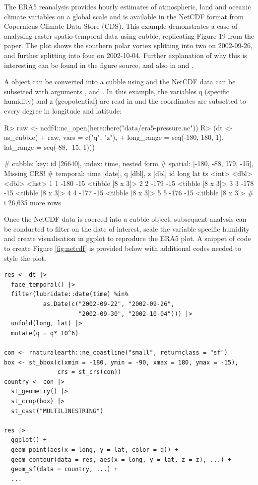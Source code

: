 \documentclass[
  shortnames]{jss}
\begin{document}
The ERA5 reanalysis \citep{hersbach2020era5} provides hourly estimates of atmospheric, land and oceanic climate variables on a global scale and is available in the NetCDF format from Copernicus Climate Data Store (CDS). This example demonstrates a case of analysing raster spatio-temporal data using cubble, replicating Figure 19 from the \citet{hersbach2020era5} paper. The plot shows the southern polar vortex splitting into two on 2002-09-26, and further splitting into four on 2002-10-04. Further explanation of why this is interesting can be found in the figure source, and also in \citet{simmons2020global} and \citet{simmons2005ecmwf}.

A  object \citep{ncdf4} can be converted into a cubble using  and the NetCDF data can be subsetted with arguments ,  and . In this example, the variables q (specific humidity) and z (geopotential) are read in and the coordinates are subsetted to every degree in longitude and latitude:

\begin{CodeChunk}
\begin{CodeInput}
R> raw <- ncdf4::nc_open(here::here("data/era5-pressure.nc"))
R> (dt <- as_cubble(
+   raw, vars = c("q", "z"),
+   long_range = seq(-180, 180, 1), lat_range = seq(-88, -15, 1)))
\end{CodeInput}
\begin{CodeOutput}
# cubble:   key: id [26640], index: time, nested form
# spatial:  [-180, -88, 179, -15], Missing CRS!
# temporal: time [date], q [dbl], z [dbl]
     id  long   lat ts              
  <int> <dbl> <dbl> <list>          
1     1  -180   -15 <tibble [8 x 3]>
2     2  -179   -15 <tibble [8 x 3]>
3     3  -178   -15 <tibble [8 x 3]>
4     4  -177   -15 <tibble [8 x 3]>
5     5  -176   -15 <tibble [8 x 3]>
# i 26,635 more rows
\end{CodeOutput}
\end{CodeChunk}

Once the NetCDF data is coerced into a cubble object, subsequent analysis can be conducted to filter on the date of interest, scale the variable specific humidity and create visualisation in ggplot to reproduce the ERA5 plot. A snippet of code to create Figure \ref{fig:netcdf} is provided below with additional codes needed to style the plot.

\begin{verbatim}
res <- dt |> 
  face_temporal() |> 
  filter(lubridate::date(time) %in% 
           as.Date(c("2002-09-22", "2002-09-26",
                     "2002-09-30", "2002-10-04"))) |>
  unfold(long, lat) |> 
  mutate(q = q* 10^6)

con <- rnaturalearth::ne_coastline("small", returnclass = "sf")
box <- st_bbox(c(xmin = -180, ymin = -90, xmax = 180, ymax = -15), 
               crs = st_crs(con)) 
country <- con |> 
  st_geometry() |> 
  st_crop(box) |> 
  st_cast("MULTILINESTRING")

res |> 
  ggplot() +
  geom_point(aes(x = long, y = lat, color = q)) + 
  geom_contour(data = res, aes(x = long, y = lat, z = z), ...) +
  geom_sf(data = country, ...) +
  ...
\end{verbatim}
\end{document}

